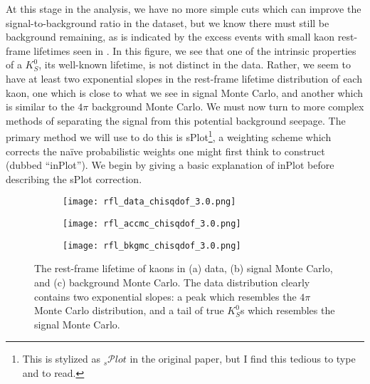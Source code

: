 At this stage in the analysis, we have no more simple cuts which can improve the signal-to-background ratio in the dataset, but we know there must still be background remaining, as is indicated by the excess events with small kaon rest-frame lifetimes seen in . In this figure, we see that one of the intrinsic properties of a $K_S^0$, its well-known lifetime, is not distinct in the data. Rather, we seem to have at least two exponential slopes in the rest-frame lifetime distribution of each kaon, one which is close to what we see in signal Monte Carlo, and another which is similar to the $4\pi$ background Monte Carlo. We must now turn to more complex methods of separating the signal from this potential background seepage. The primary method we will use to do this is sPlot\cite{pivk_splot_2005}\footnote{This is stylized as ${}_s\mathcal{P}lot$ in the original paper, but I find this tedious to type and to read.}, a weighting scheme which corrects the na\"ive probabilistic weights one might first think to construct (dubbed ``inPlot''). We begin by giving a basic explanation of inPlot before describing the sPlot correction.

\begin{figure}
  \begin{center}
    \begin{subfigure}[b]{.7\columnwidth}
      \texttt{[image: rfl\_data\_chisqdof\_3.0.png]}
      \caption{}
      \label{fig:rfl-data}
    \end{subfigure}
    \begin{subfigure}[b]{.7\columnwidth}
      \texttt{[image: rfl\_accmc\_chisqdof\_3.0.png]}
      \caption{}
      \label{fig:rfl-accmc}
    \end{subfigure}
    \begin{subfigure}[b]{.7\columnwidth}
      \texttt{[image: rfl\_bkgmc\_chisqdof\_3.0.png]}
      \caption{}
      \label{fig:rfl-bkgmc}
    \end{subfigure}
  \end{center}
  \caption{The rest-frame lifetime of kaons in (a) data, (b) signal Monte Carlo, and (c) background Monte Carlo. The data distribution clearly contains two exponential slopes: a peak which resembles the $4\pi$ Monte Carlo distribution, and a tail of true $K_S^0$s which resembles the signal Monte Carlo.}\label{fig:rfl-pre-splot}
\end{figure}

